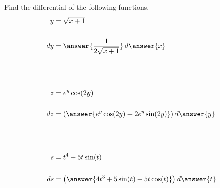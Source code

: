 \documentclass{ximera}
\author{Bobby Ramsey}
\begin{document}
\begin{exercise}


Find the differential of the following functions.
\begin{align*}
	y &= \sqrt{x+1}\\ \\
	\d y &= \answer{ \frac{1}{2 \sqrt{x+1}} } \d \answer{x} \\ \\ \\ \\
	z &= e^y\cos(2y)\\ \\
	\d z &= \left( \answer{ e^y\cos(2y) - 2 e^y \sin(2y) }\right) \d \answer{y} \\ \\ \\ \\	
	s &= t^4+5t\sin(t) \\ \\
	\d s &= \left(\answer{ 4t^3 + 5\sin(t)+5t\cos(t) } \right) \d \answer{t}
\end{align*}

\end{exercise}
\end{document}
